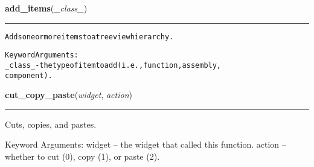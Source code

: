     \label{reliafree:utilities:add_items}

    \vspace{0.5ex}

\hspace{.8\funcindent}\begin{boxedminipage}{\funcwidth}

    \raggedright \textbf{add\_items}(\textit{\_class\_})

    \vspace{-1.5ex}

    \rule{\textwidth}{0.5\fboxrule}
\setlength{\parskip}{2ex}
\begin{alltt}
Adds one or more items to a treeview hierarchy.

Keyword Arguments:
\_class\_ - the type of item to add (i.e., function, assembly,
          component).
\end{alltt}

\setlength{\parskip}{1ex}
    \end{boxedminipage}

    \label{reliafree:utilities:cut_copy_paste}

    \vspace{0.5ex}

\hspace{.8\funcindent}\begin{boxedminipage}{\funcwidth}

    \raggedright \textbf{cut\_copy\_paste}(\textit{widget}, \textit{action})

    \vspace{-1.5ex}

    \rule{\textwidth}{0.5\fboxrule}
\setlength{\parskip}{2ex}
    Cuts, copies, and pastes.

    Keyword Arguments: widget -- the widget that called this function. 
    action -- whether to cut (0), copy (1), or paste (2).

\setlength{\parskip}{1ex}
    \end{boxedminipage}

    \label{reliafree:utilities:paste}

    \vspace{0.5ex}

